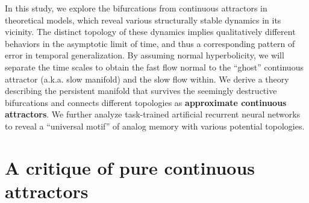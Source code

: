 \documentclass{article} %
\newcounter{ct}
\theoremstyle{definition}
\theoremstyle{remark}
\renewcommand{\cite}{\citep}
\begin{document}
In this study, we explore the bifurcations from continuous attractors in theoretical models,
which reveal various structurally stable dynamics in its vicinity.
The distinct topology of these dynamics implies qualitatively different behaviors in the asymptotic limit of time, and thus a corresponding pattern of error in temporal generalization.
By assuming normal hyperbolicity, we will separate the time scales to obtain the fast flow normal to the ``ghost'' continuous attractor (a.k.a. slow manifold) and the slow flow within.
We derive a theory describing the persistent manifold that survives the seemingly destructive bifurcations and connects different topologies as \textbf{approximate continuous attractors}.
We further analyze task-trained artificial recurrent neural networks to reveal a ``universal motif'' of analog memory with various potential topologies.



\section{A critique of pure continuous attractors}\label{sec:critique}
\end{document}
